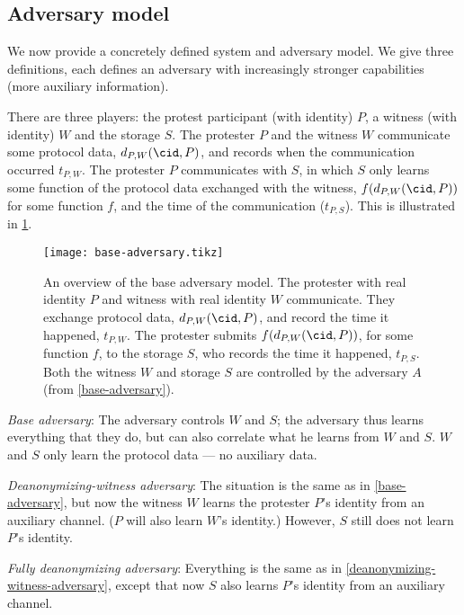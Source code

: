 \subsection{Adversary model}%
\label{formal-adversary-model}

We now provide a concretely defined system and adversary model.
We give three definitions, each defines an adversary with increasingly stronger 
capabilities (\ie more auxiliary information).

There are three players: the protest participant (with identity) \(P\), a 
witness (with identity) \(W\) and the storage \(S\).
The protester \(P\) and the witness \(W\) communicate some protocol data,
\(d_{P,W}(\cid, P)\), and records when the communication occurred \(t_{P,W}\).
The protester \(P\) communicates with \(S\), in which \(S\) only learns some 
function of the protocol data exchanged with the witness, \(f(d_{P,W}(\cid, 
  P))\) for some function \(f\), and the time of the communication 
(\(t_{P,S}\)).
This is illustrated in \cref{fig:base-adversary}.

\begin{figure}
  \centering
  \texttt{[image: base-adversary.tikz]}
  \caption{\label{fig:base-adversary}%
    An overview of the base adversary model.
    The protester with real identity \(P\) and witness with real identity \(W\) 
    communicate.
    They exchange protocol data, \(d_{P,W}(\cid, P)\), and record the time it 
    happened, \(t_{P,W}\).
    The protester submits \(f(d_{P,W}(\cid, P))\), for some function \(f\), to 
    the storage \(S\), who records the time it happened, \(t_{P,S}\).
    Both the witness \(W\) and storage \(S\) are controlled by the adversary 
    \(A\) (from \cref{base-adversary}).
  }
\end{figure}

\begin{adversaries}
\item\label{base-adversary}
  \emph{Base adversary}:
  The adversary controls \(W\) and \(S\); the adversary thus learns everything 
  that they do, but can also correlate what he learns from \(W\) and \(S\).
  \(W\) and \(S\) only learn the protocol data --- no auxiliary data.

\item\label{deanonymizing-witness-adversary}
  \emph{Deanonymizing-witness adversary}:
  The situation is the same as in \cref{base-adversary}, but now the witness 
  \(W\) learns the protester \(P\)'s identity from an auxiliary channel.
  (\(P\) will also learn \(W\)'s identity.)
  However, \(S\) still does not learn \(P\)'s identity.

\item\label{deanonymizing-adversary}
  \emph{Fully deanonymizing adversary}:
  Everything is the same as in \cref{deanonymizing-witness-adversary}, except 
  that now \(S\) also learns \(P\)'s identity from an auxiliary channel.
\end{adversaries}

